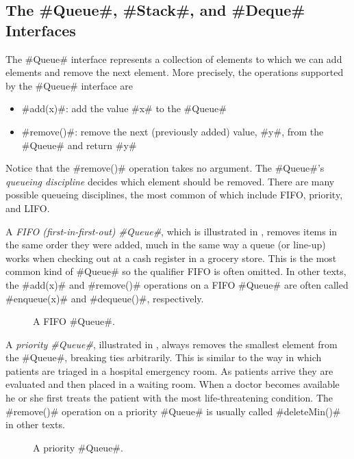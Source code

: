 \subsection{The #Queue#, #Stack#, and #Deque# Interfaces}

The #Queue# interface represents a collection of elements to which we can add elements and remove the next element.  More precisely, the operations supported by the #Queue# interface are
\begin{itemize}
  \item #add(x)#: add the value #x# to the #Queue#
  \item #remove()#: remove the next (previously added) value, #y#, from the #Queue# and return #y#
\end{itemize}
Notice that the #remove()# operation takes no argument.  The #Queue#'s \emph{queueing discipline} decides which element should be removed.  There are many possible queueing disciplines, the most common of which include FIFO, priority, and LIFO.

A \emph{FIFO (first-in-first-out) #Queue#},   which is illustrated in , removes items in the same order they were added, much in the same way a queue (or line-up) works when checking out at a cash register in a grocery store.  This is the most common kind of #Queue# so the qualifier FIFO is often omitted.  In other texts, the #add(x)# and #remove()# operations on a FIFO #Queue# are often called #enqueue(x)# and #dequeue()#, respectively.

\begin{figure}
  \caption[A FIFO queue]{A FIFO #Queue#.}
\end{figure}

A \emph{priority #Queue#},    illustrated in , always removes the smallest element from the #Queue#, breaking ties arbitrarily.  This is similar to the way in which patients are triaged in a hospital emergency room.  As patients arrive they are evaluated and then placed in a waiting room.  When a doctor becomes available he or she first treats the patient with the most life-threatening condition.  The #remove()# operation on a priority #Queue# is usually called #deleteMin()# in other texts.

\begin{figure}
  \caption[A priority queue]{A priority #Queue#.}
\end{figure}

